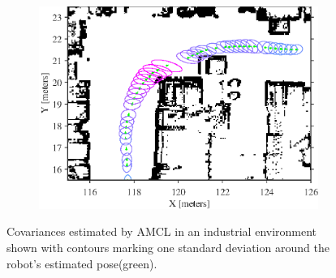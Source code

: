 \begin{figure}[htbp]
	\centering
	\begin{subfigure}[t]{0.8\textwidth}
		\includegraphics[scale=1.0]{figures/static_mapping/scan_region_with_poses}		
	\end{subfigure}
	\begin{subfigure}[t]{0.15\textwidth}
	\end{subfigure}
	\caption{Covariances estimated by AMCL in an industrial environment shown with contours marking one standard deviation around the robot's estimated pose(green).}
    \label{fig:amcl_covariance}
\end{figure}

